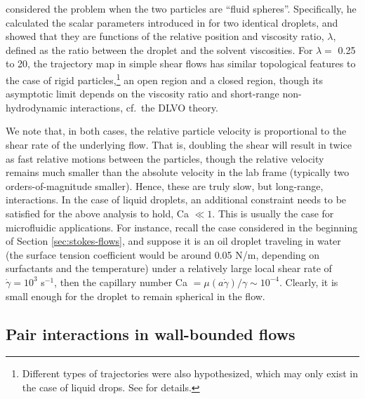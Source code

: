 \cite{Zinchenko1983,Zinchenko1984} considered the problem when the two particles are ``fluid spheres''.
Specifically, he calculated the scalar parameters introduced in \cite{batchelor_green_1972} for two identical droplets, and showed that they are functions of the relative position and viscosity ratio, $\lambda$, defined as the ratio between the droplet and the solvent viscosities.
For $\lambda=$ 0.25 to 20, the trajectory map in simple shear flows has similar topological features to the case of rigid particles,\footnote{Different types of trajectories were also hypothesized, which may only exist in the case of liquid drops. See \cite{Zinchenko1984} for details.} \ie an open region and a closed region, though its asymptotic limit depends on the viscosity ratio and short-range non-hydrodynamic interactions, cf.\ the DLVO theory.

We note that, in both cases, the relative particle velocity is proportional to the shear rate of the underlying flow.
That is, doubling the shear will result in twice as fast relative motions between the particles, though the relative velocity remains much smaller than the absolute velocity in the lab frame (typically two orders-of-magnitude smaller).
Hence, these are truly slow, but long-range, interactions.
In the case of liquid droplets, an additional constraint needs to be satisfied for the above analysis to hold, \ie Ca $\ll 1$.
This is usually the case for microfluidic applications.
For instance, recall the case considered in the beginning of Section \ref{sec:stokes-flows}, and suppose it is an oil droplet traveling in water (the surface tension coefficient would be around 0.05 N/m, depending on surfactants and the temperature) under a relatively large local shear rate of $\dot{\gamma}=10^3$ s$^{-1}$, then the capillary number Ca $=\mu(a\dot{\gamma})/\gamma \sim 10^{-4}$. Clearly, it is small enough for the droplet to remain spherical in the flow.

\subsection{Pair interactions in wall-bounded flows}


